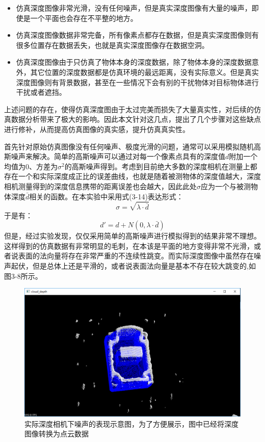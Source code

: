 \begin{itemize}
\item 仿真深度图像非常光滑，没有任何噪声，但是真实深度图像有大量的噪声，即使是一个平面也会存在不平整的地方。
\item 仿真深度图像数据非常完备，所有像素点都存在数据，但是真实深度图像则有很多位置存在数据丢失，也就是真实深度图像存在数据空洞。
\item 仿真深度图像由于只仿真了物体本身的深度数据，除了物体本身的深度数据意外，其它位置的深度数据都是仿真环境的最远距离，没有实际意义。但是真实深度图像则有背景数据，甚至在一些情况下会有别的干扰物体对目标物体进行干扰或者遮挡。
\end{itemize}
上述问题的存在，使得仿真深度图由于太过完美而损失了大量真实性，对后续的仿真数据分析带来了极大的影响。因此本文针对这几点，提出了几个步骤对这些缺点进行修补，从而提高仿真图像的真实感，提升仿真真实性。

首先针对原始仿真图像没有任何噪声、极度光滑的问题，通常可以采用模拟随机高斯噪声来解决。简单的高斯噪声可以通过对每一个像素点具有的深度值$d$附加一个均值为$0$、方差为$\sigma ^2$的高斯噪声得到。考虑到目前绝大多数的深度相机在测量上都存在一个和实际深度成正比的误差曲线，也就是随着被测物体的深度值越大，深度相机测量得到的深度信息携带的距离误差也会越大，因此此处$\sigma$应为一个与被测物体深度$\bar{d}$相关的函数。在本实验中采用式(3-14)表达形式：
\begin{equation}
	\sigma = \sqrt{\lambda \cdot \bar{d}}
\end{equation}
于是有：
\begin{equation}
	d'=d+N(0, \lambda \cdot \bar{d})
\end{equation}
但是，经过实验发现，仅仅采用简单的高斯噪声进行模拟得到的结果非常不理想。这样得到的仿真数据有非常明显的毛刺，在本该是平面的地方变得非常不光滑，或者说表面的法向量将存在非常严重的不连续性跳变。而实际深度图像中虽然存在噪声起伏，但是总体上还是平滑的，或者说表面法向量是基本不存在较大跳变的,如图3-8所示。

\begin{figure}[htb]
	\centering 
	\includegraphics[width=\textwidth]{./mypic/实际深度相机下噪声的表现示意图.png} 
	\caption{实际深度相机下噪声的表现示意图，为了方便展示，图中已经将深度图像转换为点云数据} 
\end{figure}


